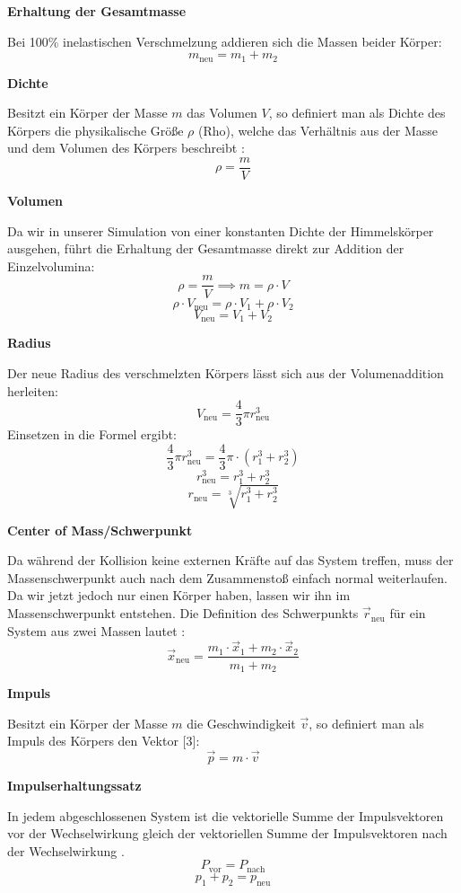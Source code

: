 \documentclass[11pt]{article}
\begin{document}
\textbf{Erhaltung der Gesamtmasse}

Bei 100\% inelastischen Verschmelzung addieren sich die Massen beider
Körper: \[
m_{\text{neu}} = m_1 + m_2
\]

\textbf{Dichte}

Besitzt ein Körper der Masse \(m\) das Volumen \(V\), so definiert man
als Dichte des Körpers die physikalische Größe \(\rho\) (Rho), welche
das Verhältnis aus der Masse und dem Volumen des Körpers beschreibt
\cite{quelle6}: \[\rho = \frac{m}{V}\]

\textbf{Volumen}

Da wir in unserer Simulation von einer konstanten Dichte der
Himmelskörper ausgehen, führt die Erhaltung der Gesamtmasse direkt zur
Addition der Einzelvolumina:
\[\rho = \frac{m}{V} \implies m = \rho \cdot V\]
\[\rho \cdot V_{\text{neu}} = \rho \cdot V_1 + \rho \cdot V_2\]
\[V_{\text{neu}} = V_1 + V_2\]

\textbf{Radius}

Der neue Radius des verschmelzten Körpers lässt sich aus der
Volumenaddition herleiten:
\[V_{\text{neu}} = \frac{4}{3}\pi r_{\text{neu}}^3\] Einsetzen in die
Formel ergibt:
\[\frac{4}{3}\pi r_{\text{neu}}^3 = \frac{4}{3}\pi \cdot \left(r_1^3 + r_2^3\right)\]
\[r_{\text{neu}}^3 = r_1^3 + r_2^3\]
\[r_{\text{neu}} = \sqrt[3]{r_1^3 + r_2^3}\]

\textbf{Center of Mass/Schwerpunkt}

Da während der Kollision keine externen Kräfte auf das System treffen,
muss der Massenschwerpunkt auch nach dem Zusammenstoß einfach normal
weiterlaufen. Da wir jetzt jedoch nur einen Körper haben, lassen wir ihn
im Massenschwerpunkt entstehen. Die Definition des Schwerpunkts
\(\vec{r}_{\text{neu}}\) für ein System aus zwei Massen lautet
\cite{quelle7}:\[\vec{x}_{\text{neu}} = \frac{m_1 \cdot \vec{x}_1 + m_2 \cdot \vec{x}_2}{m_1 + m_2}\]

\textbf{Impuls}

Besitzt ein Körper der Masse \(m\) die Geschwindigkeit \(\vec{v}\), so
definiert man als Impuls des Körpers den Vektor {[}3{]}: \[
\vec{p}=m\cdot\vec{v}
\]

\textbf{Impulserhaltungssatz}

In jedem abgeschlossenen System ist die vektorielle Summe der
Impulsvektoren vor der Wechselwirkung gleich der vektoriellen Summe der
Impulsvektoren nach der Wechselwirkung \cite{quelle3}. \[
P_{\text{vor}} = P_{\text{nach}}
\] \[
p_1 + p_2 = p_{\text{neu}}
\]
\end{document}
